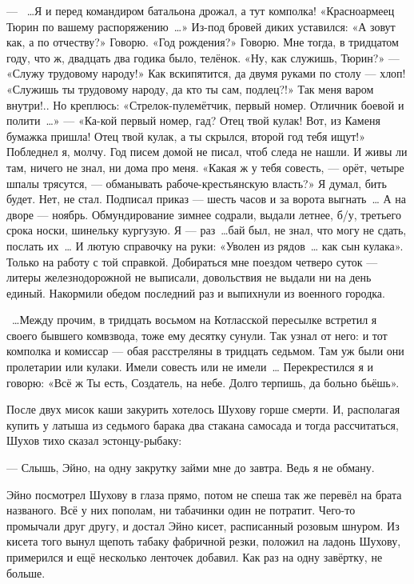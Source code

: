 --- ~\dots{}Я и перед командиром батальона дрожал, а тут комполка! «Красноармеец Тюрин по вашему распоряжению~\dots{}» Из-под бровей диких уставился: «А зовут как, а по отчеству?» Говорю. «Год рождения?» Говорю. Мне тогда, в тридцатом году, что ж, двадцать два годика было, телёнок. «Ну, как служишь, Тюрин?» --- «Служу трудовому народу!» Как вскипятится, да двумя руками по столу --- хлоп! «Служишь ты трудовому народу, да кто ты сам, подлец?!» Так меня варом внутри!.. Но креплюсь: «Стрелок-пулемётчик, первый номер. Отличник боевой и полити~\dots{}» --- «Ка-кой первый номер, гад? Отец твой кулак! Вот, из Каменя бумажка пришла! Отец твой кулак, а ты скрылся, второй год тебя ищут!» Побледнел я, молчу. Год писем домой не писал, чтоб следа не нашли. И живы ли там, ничего не знал, ни дома про меня. «Какая ж у тебя совесть, --- орёт, четыре шпалы трясутся, --- обманывать рабоче-крестьянскую власть?» Я думал, бить будет. Нет, не стал. Подписал приказ --- шесть часов и за ворота выгнать~\dots{} А на дворе --- ноябрь. Обмундирование зимнее содрали, выдали летнее, б/у, третьего срока носки, шинельку кургузую. Я --- раз~\dots{}бай был, не знал, что могу не сдать, послать их~\dots{} И лютую справочку на руки: «Уволен из рядов~\dots{} как сын кулака». Только на работу с той справкой. Добираться мне поездом четверо суток --- литеры железнодорожной не выписали, довольствия не выдали ни на день единый. Накормили обедом последний раз и выпихнули из военного городка.

~\dots{}Между прочим, в тридцать восьмом на Котласской пересылке встретил я своего бывшего комвзвода, тоже ему десятку сунули. Так узнал от него: и тот комполка и комиссар --- обая расстреляны в тридцать седьмом. Там уж были они пролетарии или кулаки. Имели совесть или не имели~\dots{} Перекрестился я и говорю: «Всё ж Ты есть, Создатель, на небе. Долго терпишь, да больно бьёшь».

После двух мисок каши закурить хотелось Шухову горше смерти. И, располагая купить у латыша из седьмого барака два стакана самосада и тогда рассчитаться, Шухов тихо сказал эстонцу-рыбаку:

--- Слышь, Эйно, на одну закрутку займи мне до завтра. Ведь я не обману.

Эйно посмотрел Шухову в глаза прямо, потом не спеша так же перевёл на брата названого. Всё у них пополам, ни табачинки один не потратит. Чего-то промычали друг другу, и достал Эйно кисет, расписанный розовым шнуром. Из кисета того вынул щепоть табаку фабричной резки, положил на ладонь Шухову, примерился и ещё несколько ленточек добавил. Как раз на одну завёртку, не больше.

